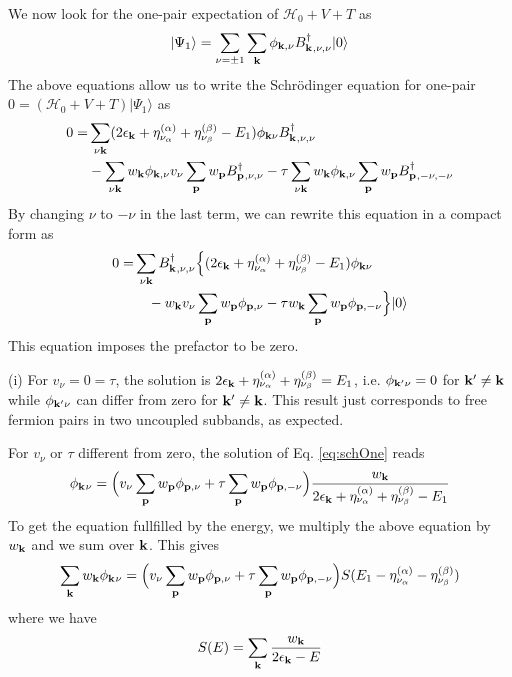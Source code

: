 \documentclass[11pt]{article} %
\begin{document}
We now look for the one-pair expectation of $\mathcal{H}_0+V+T$ as 
\begin{equation}\label{eq:Psi1}
|\Psi_1\rangle=\sum_{\nu=\pm1}\sum_{\mathbf{k}}\phi_{\mathbf{k},\nu}B^{\dagger}_{\mathbf{k}^{ },\nu,\nu}|0\rangle
\end{equation}
The above equations allow us to write the Schr\"odinger equation for one-pair $0=(\mathcal{H}_0+V+T)|\Psi_1\rangle$ as 
\begin{equation}
\begin{split}
0=&\sum_{\nu\mathbf{k}}(2\epsilon_{\mathbf{k}}+\eta_{\nu_{\alpha}}^{(\alpha)}+\eta_{\nu_{\beta}}^{(\beta)}-E_1)\phi_{\mathbf{k}\nu}B^{\dagger}_{\mathbf{k}^{ },\nu,\nu}\\
&-\sum_{\nu\mathbf{k}}w_{\mathbf{k}}\phi_{\mathbf{k},\nu}v_{\nu}\sum_{\mathbf{p}}w_{\mathbf{p}}B^{\dagger}_{\mathbf{p}^{ },\nu,\nu}
 -\tau\sum_{\nu\mathbf{k}}w_{\mathbf{k}}\phi_{\mathbf{k},\nu}\sum_{\mathbf{p}}w_{\mathbf{p}}B^{\dagger}_{\mathbf{p}^{ },-\nu,-\nu}
\end{split}
\end{equation}
By changing $\nu$ to $-\nu$ in the last term, we can rewrite this equation in a compact form as 
\begin{equation}\label{eq:schOne}
\begin{split}
0=&\sum_{\nu\mathbf{k}}B^{\dagger}_{\mathbf{k}^{ },\nu,\nu}\Big\{(2\epsilon_{\mathbf{k}}+\eta_{\nu_{\alpha}}^{(\alpha)}+\eta_{\nu_{\beta}}^{(\beta)}-E_1)\phi_{\mathbf{k}\nu}\\
&\quad-w_{\mathbf{k}}v_{\nu}\sum_{\mathbf{p}}w_{\mathbf{p}}\phi_{\mathbf{p},\nu}-\tau{}w_{\mathbf{k}}\sum_{\mathbf{p}}w_{\mathbf{p}}\phi_{\mathbf{p},-\nu}\Big\}|0\rangle
\end{split}
\end{equation}
This equation imposes the prefactor to be zero. 

(i) For $v_{\nu}=0=\tau$, the solution is $2\epsilon_{\mathbf{k}}+\eta_{\nu_{\alpha}}^{(\alpha)}+\eta_{\nu_{\beta}}^{(\beta)}=E_1$, i.e. $\phi_{\mathbf{k}^{{\prime}}\nu}=0$ for $\mathbf{k}^{{\prime}}\neq\mathbf{k}$ while $\phi_{\mathbf{k}^{{\prime}}\nu}$ can differ from zero for  $\mathbf{k}^{{\prime}}\neq\mathbf{k}$. This result just corresponds to free fermion pairs in two uncoupled subbands, as expected. 

For $v_{\nu}$ or $\tau$ different from zero, the solution of Eq. \ref{eq:schOne} reads
\begin{equation}\label{eq:phi}
\phi_{\mathbf{k}^{}\nu}=\Big(v_{\nu}\sum_{\mathbf{p}}w_{\mathbf{p}}\phi_{\mathbf{p},\nu}+\tau{}\sum_{\mathbf{p}}w_{\mathbf{p}}\phi_{\mathbf{p},-\nu}\Big)
\frac{w_{\mathbf{k}}}{2\epsilon_{\mathbf{k}}+\eta_{\nu_{\alpha}}^{(\alpha)}+\eta_{\nu_{\beta}}^{(\beta)}-E_1}
\end{equation}
To get the equation fullfilled by the energy, we multiply the above equation by $w_{\mathbf{k}}$ and we sum over $\mathbf{k}$.  This gives 
\begin{equation}\label{eq:phiS}
\sum_{\mathbf{k}}w_{\mathbf{k}}\phi_{\mathbf{k}^{}\nu}=\Big(v_{\nu}\sum_{\mathbf{p}}w_{\mathbf{p}}\phi_{\mathbf{p},\nu}+\tau{}\sum_{\mathbf{p}}w_{\mathbf{p}}\phi_{\mathbf{p},-\nu}\Big)
S(E_1-\eta_{\nu_{\alpha}}^{(\alpha)}-\eta_{\nu_{\beta}}^{(\beta)})
\end{equation}
where we have 
\begin{equation}\label{eq:Sdef}
S(E)=\sum_{\mathbf{k}}\frac{w_{\mathbf{k}}}{2\epsilon_{\mathbf{k}}-E}
\end{equation}
\end{document}
